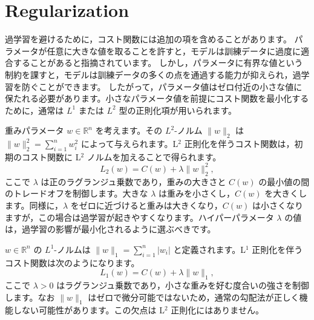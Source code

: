 \documentclass[dvipdfmx,a4paper]{jsarticle}%
\begin{document}
\section{\textbf{Regularization}}
\thispagestyle{plain}
過学習を避けるために，コスト関数には追加の項を含めることがあります。
パラメータが任意に大きな値を取ることを許すと，モデルは訓練データに過度に適合することがあると指摘されています。
しかし，パラメータに有界な値という制約を課すと，モデルは訓練データの多くの点を通過する能力が抑えられ，過学習を防ぐことができます。
したがって，パラメータ値はゼロ付近の小さな値に保たれる必要があります。小さなパラメータ値を前提にコスト関数を最小化するために，通常は \(L^{1}\) または \(L^{2}\) 型の正則化項が用いられます。
\vspace{2cm}
\begin{dfn}\label{def:cross-entropy}
重みパラメータ \(w \in \mathbb{R}^n\) を考えます。その \(L^{2}\)-ノルム \(\lVert w\rVert_{2}\) は \(\lVert w\rVert_{2}^{2}=\sum_{i=1}^{n} w_{i}^{2}\) によって与えられます。L\(^2\) 正則化を伴うコスト関数は，初期のコスト関数に L\(^2\) ノルムを加えることで得られます。
\[
L_{2}(w)=C(w)+\lambda \lVert w\rVert_{2}^{2},
\]
ここで \(\lambda\) は正のラグランジュ乗数であり，重みの大きさと \(C(w)\) の最小値の間のトレードオフを制御します。大きな \(\lambda\) は重みを小さくし，\(C(w)\) を大きくします。同様に，\(\lambda\) をゼロに近づけると重みは大きくなり，\(C(w)\) は小さくなりますが，この場合は過学習が起きやすくなります。ハイパーパラメータ \(\lambda\) の値は，過学習の影響が最小化されるように選ぶべきです。
\end{dfn}
\vspace{1.5cm}
\begin{dfn}\label{def:renyi-entropy}
\(w \in \mathbb{R}^{n}\) の \(L^{1}\)-ノルムは \(\lVert w\rVert_{1}=\sum_{i=1}^{n} \lvert w_{i}\rvert\) と定義されます。L\(^1\) 正則化を伴うコスト関数は次のようになります。
\[
L_{1}(w)=C(w)+\lambda \lVert w\rVert_{1},
\]
ここで \(\lambda>0\) はラグランジュ乗数であり，小さな重みを好む度合いの強さを制御します。なお \(\lVert w\rVert_{1}\) はゼロで微分可能ではないため，通常の勾配法が正しく機能しない可能性があります。この欠点は L\(^2\) 正則化にはありません。
\end{dfn}
\newpage
\end{document}
